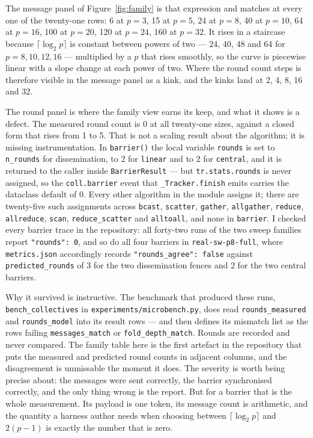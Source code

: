 \documentclass[11pt]{article}
\begin{document}
The message panel of Figure~\ref{fig:family} is that expression and matches at every one of the
twenty-one rows: 6 at $p=3$, 15 at $p=5$, 24 at $p=8$, 40 at $p=10$, 64 at $p=16$, 100 at
$p=20$, 120 at $p=24$, 160 at $p=32$. It rises in a staircase because $\lceil\log_2 p\rceil$ is
constant between powers of two --- 24, 40, 48 and 64 for $p = 8, 10, 12, 16$ --- multiplied by a
$p$ that rises smoothly, so the curve is piecewise linear with a slope change at each power of
two. Where the round count steps is therefore visible in the message panel as a kink, and the
kinks land at 2, 4, 8, 16 and 32.

The round panel is where the family view earns its keep, and what it shows is a defect. The
measured round count is 0 at all twenty-one sizes, against a closed form that rises from 1 to
5. That is not a scaling result about the algorithm; it is missing instrumentation. In
\texttt{barrier()} the local variable \texttt{rounds} is set to \texttt{n\_rounds} for
dissemination, to 2 for \texttt{linear} and to 2 for \texttt{central}, and it is returned to
the caller inside \texttt{BarrierResult} --- but \texttt{tr.stats.rounds} is never assigned, so
the \texttt{coll.barrier} event that \texttt{\_Tracker.finish} emits carries the dataclass
default of 0. Every other algorithm in the module assigns it; there are twenty-five such
assignments across \texttt{bcast}, \texttt{scatter}, \texttt{gather}, \texttt{allgather},
\texttt{reduce}, \texttt{allreduce}, \texttt{scan}, \texttt{reduce\_scatter} and
\texttt{alltoall}, and none in \texttt{barrier}. I checked every barrier trace in the
repository: all forty-two runs of the two sweep families report \texttt{"rounds": 0}, and so do
all four barriers in \texttt{real-sw-p8-full}, where \texttt{metrics.json} accordingly records
\texttt{"rounds\_agree": false} against \texttt{predicted\_rounds} of 3 for the two
dissemination fences and 2 for the two central barriers.

Why it survived is instructive. The benchmark that produced these runs,
\texttt{bench\_collectives} in \texttt{experiments/microbench.py}, does read
\texttt{rounds\_measured} and \texttt{rounds\_model} into its result rows --- and then defines
its mismatch list as the rows failing \texttt{messages\_match} or \texttt{fold\_depth\_match}.
Rounds are recorded and never compared. The family table here is the first artefact in the
repository that puts the measured and predicted round counts in adjacent columns, and the
disagreement is unmissable the moment it does. The severity is worth being precise about: the
messages were sent correctly, the barrier synchronised correctly, and the only thing wrong is
the report. But for a barrier that is the whole measurement. Its payload is one token, its
message count is arithmetic, and the quantity a harness author needs when choosing between
$\lceil\log_2 p\rceil$ and $2(p-1)$ is exactly the number that is zero.
\end{document}
